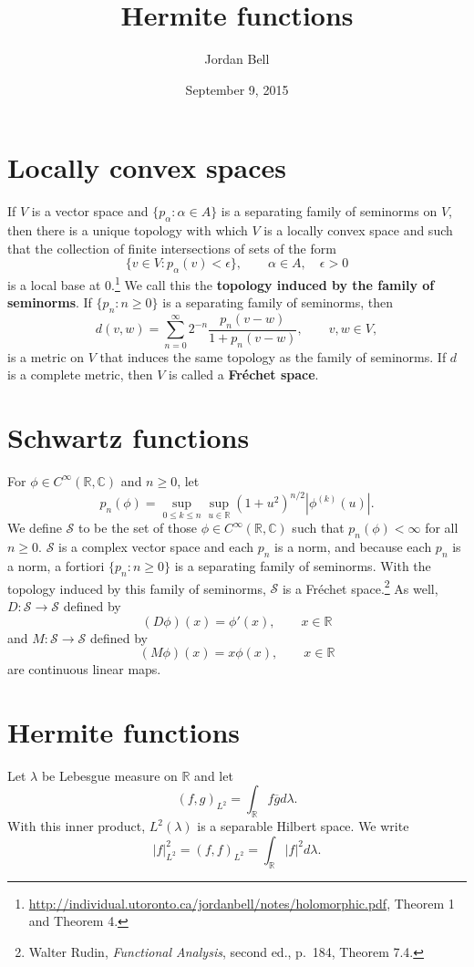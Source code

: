 \documentclass{article}
\theoremstyle{definition}
\begin{document}
\title{Hermite functions}
\author{Jordan Bell}
\date{September 9, 2015}

\maketitle


\section{Locally convex spaces}
If $V$ is a vector space and $\{p_\alpha: \alpha \in A\}$ is a separating family of seminorms on $V$,
then there is a unique  topology
with which $V$  is a locally convex space and such that the collection of
finite intersections of  sets of the form
\[
\{v \in V: p_\alpha(v)<\epsilon\},\qquad \alpha \in A,\quad \epsilon>0
\]
is a local base at $0$.\footnote{\url{http://individual.utoronto.ca/jordanbell/notes/holomorphic.pdf},
Theorem 1 and Theorem 4.}  We call this the \textbf{topology induced by the family of seminorms}.
If $\{p_n: n \geq 0\}$ is a separating family of seminorms, then 
\[
d(v,w) = \sum_{n=0}^\infty 2^{-n} \frac{p_n(v-w)}{1+p_n(v-w)}, \qquad v,w \in V,
\]
is a metric on $V$ that induces the same topology as the family of seminorms. 
If $d$ is a complete metric, then $V$ is called a \textbf{Fr\'echet space}. 




\section{Schwartz functions}
For $\phi \in C^\infty(\mathbb{R},\mathbb{C})$ and $n \geq 0$,
let 
\[
p_n(\phi) =\sup_{0 \leq k \leq n} \sup_{u \in \mathbb{R}} (1+u^2)^{n/2} |\phi^{(k)}(u)|.
\]
We define $\mathscr{S}$ to be the set of those 
$\phi \in C^\infty(\mathbb{R},\mathbb{C})$ such that $p_n(\phi)<\infty$ for all $n \geq 0$. 
$\mathscr{S}$ is a complex vector space 
and each $p_n$ is a norm, and
because each $p_n$ is a norm, a fortiori $\{p_n:  n \geq 0\}$ is a separating family of seminorms.
With the topology induced by this family of seminorms, $\mathscr{S}$ is a Fr\'echet space.\footnote{Walter
Rudin, {\em Functional Analysis}, second ed., p.~184, Theorem 7.4.}
As well, $D:\mathscr{S} \to \mathscr{S}$ defined by
\[
(D\phi)(x) = \phi'(x),\qquad x \in \mathbb{R}
\]
and
$M:\mathscr{S} \to \mathscr{S}$ defined by
\[
(M\phi)(x) = x \phi(x),\qquad x \in \mathbb{R}
\]
are continuous linear maps.


\section{Hermite functions}
Let $\lambda$ be Lebesgue measure on $\mathbb{R}$ and let
\[
(f,g)_{L^2} = \int_{\mathbb{R}} f\overline{g} d\lambda.
\]
With this inner product, $L^2(\lambda)$ is a  separable Hilbert space. We write
\[
|f|_{L^2}^2 = (f,f)_{L^2} = \int_{\mathbb{R}} |f|^2 d\lambda.
\]
\end{document}
